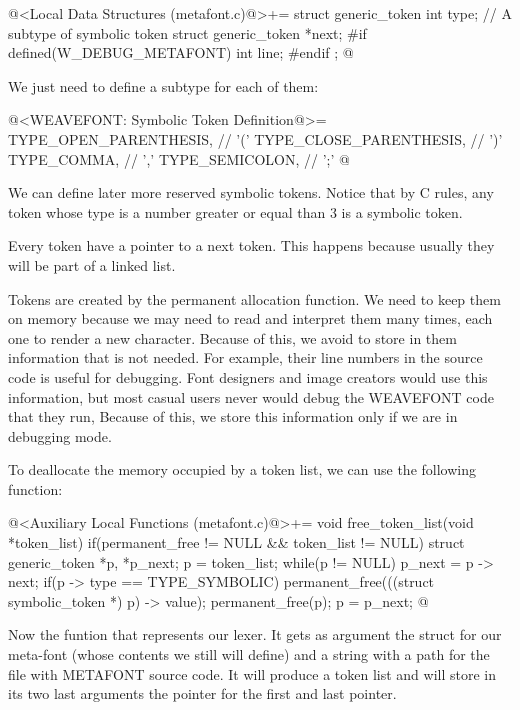 \iniciocodigo
@<Local Data Structures (metafont.c)@>+=
struct generic_token{
  int type;   // A subtype of symbolic token
  struct generic_token *next;
#if defined(W_DEBUG_METAFONT)
  int line;
#endif
};
@
\fimcodigo

We just need to define a subtype for each of them:

\iniciocodigo
@<WEAVEFONT: Symbolic Token Definition@>=
TYPE_OPEN_PARENTHESIS,  // '('
TYPE_CLOSE_PARENTHESIS, // ')'
TYPE_COMMA,             // ','
TYPE_SEMICOLON,         // ';'
@
\fimcodigo


We can define later more reserved symbolic tokens. Notice that by
C  rules, any token whose type is a number greater or
equal than 3 is a symbolic token.

Every token have a pointer to a next token. This happens because
usually they will be part of a linked list.

Tokens are created by the permanent allocation function. We need to
keep them on memory because we may need to read and interpret them
many times, each one to render a new character. Because of this, we
avoid to store in them information that is not needed. For example,
their line numbers in the source code is useful for debugging. Font
designers and image creators would use this information, but most
casual users never would debug the WEAVEFONT code that they run,
Because of this, we store this information only if we are in debugging
mode.

To deallocate the memory occupied by a token list, we can use the
following function:

\iniciocodigo
@<Auxiliary Local Functions (metafont.c)@>+=
void free_token_list(void *token_list){
  if(permanent_free != NULL && token_list != NULL){
    struct generic_token *p, *p_next;
    p = token_list;
    while(p != NULL){
      p_next = p -> next;
      if(p -> type == TYPE_SYMBOLIC)
        permanent_free(((struct symbolic_token *) p) -> value);
      permanent_free(p);
      p = p_next;
    }
  }
}
@
\fimcodigo


Now the funtion that represents our lexer. It gets as argument the
struct for our meta-font (whose contents we still will define) and a
string with a path for the file with METAFONT source code. It will
produce a token list and will store in its two last arguments the
pointer for the first and last pointer.

